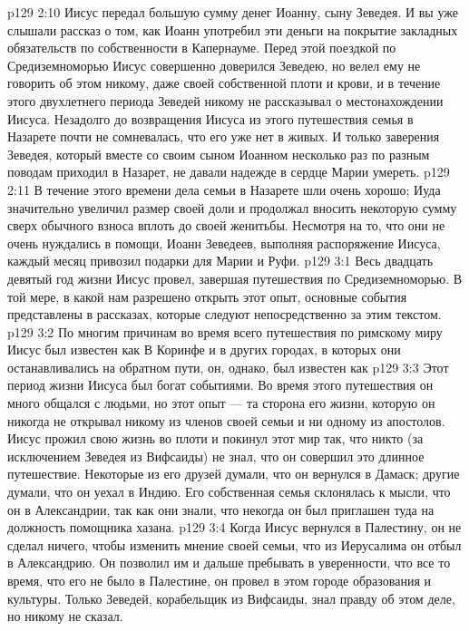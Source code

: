 \vs p129 2:10 Иисус передал большую сумму денег Иоанну, сыну Зеведея. И вы уже слышали рассказ о том, как Иоанн употребил эти деньги на покрытие закладных обязательств по собственности в Капернауме. Перед этой поездкой по Средиземноморью Иисус совершенно доверился Зеведею, но велел ему не говорить об этом никому, даже своей собственной плоти и крови, и в течение этого двухлетнего периода Зеведей никому не рассказывал о местонахождении Иисуса. Незадолго до возвращения Иисуса из этого путешествия семья в Назарете почти не сомневалась, что его уже нет в живых. И только заверения Зеведея, который вместе со своим сыном Иоанном несколько раз по разным поводам приходил в Назарет, не давали надежде в сердце Марии умереть.
\vs p129 2:11 \pc В течение этого времени дела семьи в Назарете шли очень хорошо; Иуда значительно увеличил размер своей доли и продолжал вносить некоторую сумму сверх обычного взноса вплоть до своей женитьбы. Несмотря на то, что они не очень нуждались в помощи, Иоанн Зеведеев, выполняя распоряжение Иисуса, каждый месяц привозил подарки для Марии и Руфи.
\vs p129 3:1 Весь двадцать девятый год жизни Иисус провел, завершая путешествия по Средиземноморью. В той мере, в какой нам разрешено открыть этот опыт, основные события представлены в рассказах, которые следуют непосредственно за этим текстом.
\vs p129 3:2 \pc По многим причинам во время всего путешествия по римскому миру Иисус был известен как  В Коринфе и в других городах, в которых они останавливались на обратном пути, он, однако, был известен как 
\vs p129 3:3 Этот период жизни Иисуса был богат событиями. Во время этого путешествия он много общался с людьми, но этот опыт --- та сторона его жизни, которую он никогда не открывал никому из членов своей семьи и ни одному из апостолов. Иисус прожил свою жизнь во плоти и покинул этот мир так, что никто (за исключением Зеведея из Вифсаиды) не знал, что он совершил это длинное путешествие. Некоторые из его друзей думали, что он вернулся в Дамаск; другие думали, что он уехал в Индию. Его собственная семья склонялась к мысли, что он в Александрии, так как они знали, что некогда он был приглашен туда на должность помощника хазана.
\vs p129 3:4 Когда Иисус вернулся в Палестину, он не сделал ничего, чтобы изменить мнение своей семьи, что из Иерусалима он отбыл в Александрию. Он позволил им и дальше пребывать в уверенности, что все то время, что его не было в Палестине, он провел в этом городе образования и культуры. Только Зеведей, корабельщик из Вифсаиды, знал правду об этом деле, но никому не сказал.
